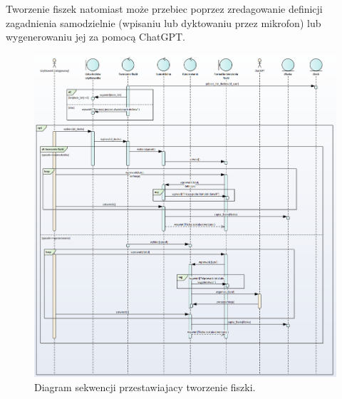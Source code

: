 \indent Tworzenie fiszek natomiast może przebiec poprzez zredagowanie definicji zagadnienia samodzielnie (wpisaniu lub dyktowaniu przez mikrofon) lub wygenerowaniu jej za pomocą ChatGPT.

    \begin{figure}[H]
    \centering
    \includegraphics[width=1\textwidth]{chapters/chapter_6/diagram_sekwencji_2}
    \caption{Diagram sekwencji przestawiajacy tworzenie fiszki.}
    \label{img:diagram_sekwencji_2}
\end{figure}




    


